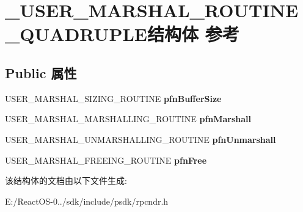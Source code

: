 \hypertarget{struct___u_s_e_r___m_a_r_s_h_a_l___r_o_u_t_i_n_e___q_u_a_d_r_u_p_l_e}{}\section{\+\_\+\+U\+S\+E\+R\+\_\+\+M\+A\+R\+S\+H\+A\+L\+\_\+\+R\+O\+U\+T\+I\+N\+E\+\_\+\+Q\+U\+A\+D\+R\+U\+P\+L\+E结构体 参考}
\label{struct___u_s_e_r___m_a_r_s_h_a_l___r_o_u_t_i_n_e___q_u_a_d_r_u_p_l_e}
\subsection*{Public 属性}
\begin{DoxyCompactItemize}
\item 
\mbox{\label{struct___u_s_e_r___m_a_r_s_h_a_l___r_o_u_t_i_n_e___q_u_a_d_r_u_p_l_e_a75827cce65d3d53d5e4790c68f30bbd4}} 
U\+S\+E\+R\+\_\+\+M\+A\+R\+S\+H\+A\+L\+\_\+\+S\+I\+Z\+I\+N\+G\+\_\+\+R\+O\+U\+T\+I\+NE {\bfseries pfn\+Buffer\+Size}
\item 
\mbox{\label{struct___u_s_e_r___m_a_r_s_h_a_l___r_o_u_t_i_n_e___q_u_a_d_r_u_p_l_e_aa5914d40a4eb2f2d56124d4318ad86f0}} 
U\+S\+E\+R\+\_\+\+M\+A\+R\+S\+H\+A\+L\+\_\+\+M\+A\+R\+S\+H\+A\+L\+L\+I\+N\+G\+\_\+\+R\+O\+U\+T\+I\+NE {\bfseries pfn\+Marshall}
\item 
\mbox{\label{struct___u_s_e_r___m_a_r_s_h_a_l___r_o_u_t_i_n_e___q_u_a_d_r_u_p_l_e_ae5481919c217fb086828ad17906d9f66}} 
U\+S\+E\+R\+\_\+\+M\+A\+R\+S\+H\+A\+L\+\_\+\+U\+N\+M\+A\+R\+S\+H\+A\+L\+L\+I\+N\+G\+\_\+\+R\+O\+U\+T\+I\+NE {\bfseries pfn\+Unmarshall}
\item 
\mbox{\label{struct___u_s_e_r___m_a_r_s_h_a_l___r_o_u_t_i_n_e___q_u_a_d_r_u_p_l_e_abd1f7e20cb64c291c4c936d49e9a2ce8}} 
U\+S\+E\+R\+\_\+\+M\+A\+R\+S\+H\+A\+L\+\_\+\+F\+R\+E\+E\+I\+N\+G\+\_\+\+R\+O\+U\+T\+I\+NE {\bfseries pfn\+Free}
\end{DoxyCompactItemize}


该结构体的文档由以下文件生成\+:\begin{DoxyCompactItemize}
\item 
E\+:/\+React\+O\+S-\/0../sdk/include/psdk/rpcndr.\+h\end{DoxyCompactItemize}
